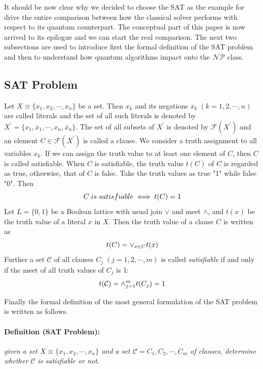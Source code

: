\documentclass[english]{article}
\begin{document}
			 It should be now clear why we decided to choose the SAT as the example for drive the entire comparison between how the classical solver performs with respect to its quantum counterpart. The conceptual part of this paper is now arrived to its epilogue and we can start the real comparison. The next two subsections are used to introduce first the formal definition of the SAT problem and then to understand how quantum algorithms impact onto the $\mathcal{N}\mathcal{P}$ class.
		
		\subsection{SAT Problem}
		\label{sec:sat}
			Let $X\equiv\{x_1, x_2, \cdots, x_n\}$ be a set. Then $x_k$ and its negations $\overline{x}_k\;(k=1, 2, \cdots, n)$ are called literals and the set of all such literals is denoted by $X^{'}=\{x_1,\overline{x}_1,\cdots, x_n, \overline{x}_n\}$. The set of all subsets of $X^{'}$ is denoted by $\mathcal{F}(X^{'})$ and an element $C\in\mathcal{F}(X^{'})$ is called a clause. We consider a truth assignment to all variables $x_k$. If we can assign the truth value to at least one element of $C$, then $C$ is called satisfiable. When $C$ is satisfiable, the truth value $t(C)$ of $C$ is regarded as true, otherwise, that of $C$ is false. Take the truth values as true "1" while false "0". Then 
			\begin{equation*}
				\centering
				C\;is\;satisfiable\iff t(C)=1
			\end{equation*}
			Let $L=\{0,1\}$ be a Boolean lattice with usual join $\lor$ and meet $\land$, and $t(x)$ be the truth value of a literal $x$ in $X$. Then the truth value of a clause $C$ is written as
			\begin{equation*}
				\centering
				t(C) = \lor_{x\in C}t(x) 
			\end{equation*}
			Further  a set $\mathcal{C}$ of all clauses $C_j\;(j = 1, 2, \cdots, m)$ is called \emph{satisfiable} if and only if the meet of all truth values of $C_j$ is 1:
			\begin{equation*}
				\centering
				t(\mathcal{C}) = \land_{j = 1}^{m}t(C_j) = 1 
			\end{equation*}
			
			Finally the formal definition of the most general formulation of the SAT problem is written as follows.
			
			\paragraph{Definition (SAT Problem):} \emph{given a set $X\equiv \{x_1,x_2,\cdots,x_n\}$ and a set $\mathcal{C}={C_1,C_2,\cdots,C_m}$ of clauses, determine whether $\mathcal{C}$ is satisfiable or not.} \\
			
\end{document}
